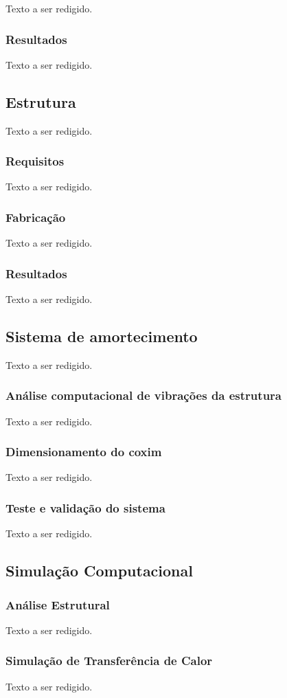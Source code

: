 Texto a ser redigido.

\subsubsection{Resultados}

Texto a ser redigido.

\subsection{Estrutura}

Texto a ser redigido.

\subsubsection{Requisitos}

Texto a ser redigido.

\subsubsection{Fabricação}
Texto a ser redigido.
\subsubsection{Resultados}
Texto a ser redigido.
\subsection{Sistema de amortecimento}
Texto a ser redigido.
\subsubsection{Análise computacional de vibrações da estrutura}
Texto a ser redigido.
\subsubsection{Dimensionamento do coxim}
Texto a ser redigido.
\subsubsection{Teste e validação do sistema}
Texto a ser redigido.
\subsection{Simulação Computacional}

\subsubsection{Análise Estrutural}
Texto a ser redigido.
\subsubsection{Simulação de Transferência de Calor }
Texto a ser redigido.